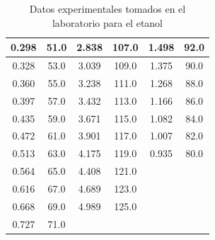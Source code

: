 \documentclass[a4paper,12pt,titlepage]{article}
\begin{document}
\begin{table}[h!]
\begin{tabular}{|cccccc}
\multicolumn{1}{|c|}{0.298}       & \multicolumn{1}{c|}{51.0}               & \multicolumn{1}{c|}{2.838}       & \multicolumn{1}{c|}{107.0}              & \multicolumn{1}{c|}{1.498}       & \multicolumn{1}{c|}{92.0}               \\ \hline
\multicolumn{1}{|c|}{0.328}       & \multicolumn{1}{c|}{53.0}               & \multicolumn{1}{c|}{3.039}       & \multicolumn{1}{c|}{109.0}              & \multicolumn{1}{c|}{1.375}       & \multicolumn{1}{c|}{90.0}               \\ \hline
\multicolumn{1}{|c|}{0.360}        & \multicolumn{1}{c|}{55.0}               & \multicolumn{1}{c|}{3.238}       & \multicolumn{1}{c|}{111.0}              & \multicolumn{1}{c|}{1.268}       & \multicolumn{1}{c|}{88.0}               \\ \hline
\multicolumn{1}{|c|}{0.397}       & \multicolumn{1}{c|}{57.0}               & \multicolumn{1}{c|}{3.432}       & \multicolumn{1}{c|}{113.0}              & \multicolumn{1}{c|}{1.166}       & \multicolumn{1}{c|}{86.0}               \\ \hline
\multicolumn{1}{|c|}{0.435}       & \multicolumn{1}{c|}{59.0}               & \multicolumn{1}{c|}{3.671}       & \multicolumn{1}{c|}{115.0}              & \multicolumn{1}{c|}{1.082}       & \multicolumn{1}{c|}{84.0}               \\ \hline
\multicolumn{1}{|c|}{0.472}       & \multicolumn{1}{c|}{61.0}               & \multicolumn{1}{c|}{3.901}       & \multicolumn{1}{c|}{117.0}              & \multicolumn{1}{c|}{1.007}       & \multicolumn{1}{c|}{82.0}               \\ \hline
\multicolumn{1}{|c|}{0.513}       & \multicolumn{1}{c|}{63.0}               & \multicolumn{1}{c|}{4.175}       & \multicolumn{1}{c|}{119.0}              & \multicolumn{1}{c|}{0.935}       & \multicolumn{1}{c|}{80.0}               \\ \hline
\multicolumn{1}{|c|}{0.564}       & \multicolumn{1}{c|}{65.0}               & \multicolumn{1}{c|}{4.408}       & \multicolumn{1}{c|}{121.0}              &                                  &                                         \\ \cline{1-4}
\multicolumn{1}{|c|}{0.616}       & \multicolumn{1}{c|}{67.0}               & \multicolumn{1}{c|}{4.689}       & \multicolumn{1}{c|}{123.0}              &                                  &                                         \\ \cline{1-4}
\multicolumn{1}{|c|}{0.668}       & \multicolumn{1}{c|}{69.0}               & \multicolumn{1}{c|}{4.989}       & \multicolumn{1}{c|}{125.0}              &                                  &                                         \\ \cline{1-4}
\multicolumn{1}{|c|}{0.727}       & \multicolumn{1}{c|}{71.0}               &                                  &                                         &                                  &                                         \\ \cline{1-2}
\end{tabular}
\caption{Datos experimentales tomados en el laboratorio para el etanol}
\label{tab:my-table}
\end{table}
\end{document}
